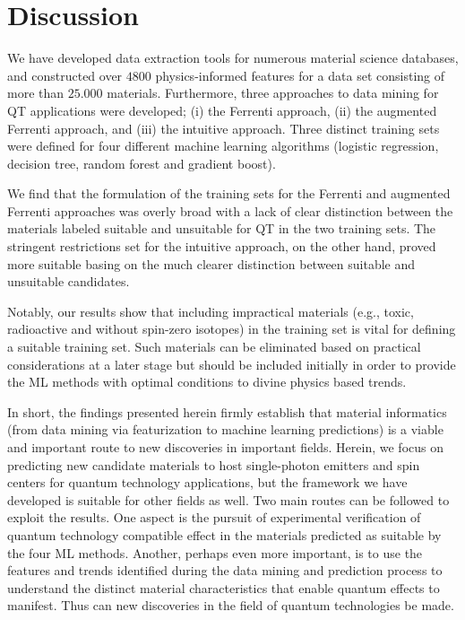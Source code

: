 \documentclass[superscriptaddress,unsortedaddress,
 amsmath,amssymb,
 aps,
]{revtex4-2}
\begin{document}
\section*{Discussion} 
We have developed data extraction tools for numerous material science databases, and constructed over $4800$ physics-informed features for a data set consisting of more than $25.000$ materials. Furthermore, three approaches to data mining for QT applications were developed; (i) the Ferrenti approach,  (ii) the augmented Ferrenti approach, and (iii) the intuitive approach.  
Three distinct training sets were defined for four different machine learning algorithms (logistic regression, decision tree, random forest and gradient boost). 

We find that the formulation of the training sets for the Ferrenti and augmented Ferrenti approaches was overly broad with a lack of clear distinction between the materials labeled suitable and unsuitable for QT in the two training sets. The stringent restrictions set for the intuitive approach, on the other hand, proved more suitable basing on the much clearer distinction between suitable and unsuitable candidates. 

Notably, our results show that including impractical materials (e.g., toxic, radioactive and without spin-zero isotopes) in the training set is vital for defining a suitable training set. 
Such materials can be eliminated based on practical considerations at a later stage but should be included initially in order to provide the ML methods with optimal conditions to divine physics based trends. 

In short, the findings presented herein firmly establish that material informatics (from data mining via featurization to machine learning predictions) is a viable and important route to new discoveries in important fields.  Herein, we focus on predicting new candidate materials to host single-photon emitters and spin centers for quantum technology applications, but the framework we have developed is suitable for other fields as well. 
Two main routes can be followed to exploit the results. One aspect is the pursuit of experimental verification of quantum technology compatible effect in the materials predicted as suitable by the four ML methods. Another, perhaps even more important, is to use the features and trends identified during the data mining and prediction process to understand the distinct material characteristics that enable quantum effects to manifest. Thus can new discoveries in the field of quantum technologies be made. 
\end{document}

